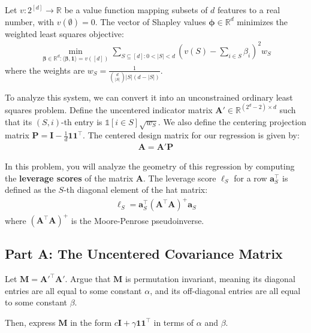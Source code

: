 \documentclass{article}
\begin{document}
Let \(v: 2^{[d]} \to \mathbb{R}\) be a value function mapping subsets of \(d\) features to a real number, with \(v(\emptyset) = 0\). The vector of Shapley values \(\boldsymbol{\phi} \in \mathbb{R}^d\) minimizes the weighted least squares objective: \begin{align*}
\min_{\boldsymbol{\beta} \in \mathbb{R}^d: \langle \boldsymbol{\beta}, \mathbf{1} \rangle = v([d])}
\sum_{S \subseteq [d]: 0 < |S| < d}
\left( v(S) - \sum_{i \in S} \beta_i \right)^2 w_S
\end{align*} where the weights are \(w_S = \frac{1}{\binom{d}{|S|} |S| (d-|S|)}\).

To analyze this system, we can convert it into an unconstrained ordinary least squares problem. Define the uncentered indicator matrix \(\mathbf{A}' \in \mathbb{R}^{(2^d-2) \times d}\) such that its \((S,i)\)-th entry is \(\mathbb{1}[i \in S] \sqrt{w_S}\). We also define the centering projection matrix \(\mathbf{P} = \mathbf{I} - \frac{1}{d} \mathbf{1} \mathbf{1}^\top\). The centered design matrix for our regression is given by: \begin{align*}
\mathbf{A} = \mathbf{A}' \mathbf{P}
\end{align*}

In this problem, you will analyze the geometry of this regression by computing the \textbf{leverage scores} of the matrix \(\mathbf{A}\). The leverage score \(\ell_S\) for a row \(\mathbf{a}_S^\top\) is defined as the \(S\)-th diagonal element of the hat matrix: \begin{align*}
\ell_S = \mathbf{a}_S^\top (\mathbf{A}^\top \mathbf{A})^+ \mathbf{a}_S
\end{align*} where \((\mathbf{A}^\top \mathbf{A})^+\) is the Moore-Penrose pseudoinverse.

\hypertarget{part-a-the-uncentered-covariance-matrix}{%
\subsection*{Part A: The Uncentered Covariance Matrix}\label{part-a-the-uncentered-covariance-matrix}}

Let \(\mathbf{M} = \mathbf{A}'^\top \mathbf{A}'\). Argue that \(\mathbf{M}\) is permutation invariant, meaning its diagonal entries are all equal to some constant \(\alpha\), and its off-diagonal entries are all equal to some constant \(\beta\).

Then, express \(\mathbf{M}\) in the form \(c \mathbf{I} + \gamma \mathbf{1} \mathbf{1}^\top\) in terms of \(\alpha\) and \(\beta\).
\end{document}
